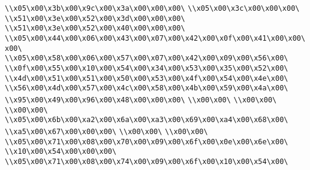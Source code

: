 \verb|\\x05\x00\x3b\x00\x9c\x00\x3a\x00\x00\x00\|\newline
\verb|\\x05\x00\x3c\x00\x00\x00\|\newline
\verb|\\x51\x00\x3e\x00\x52\x00\x3d\x00\x00\x00\|\newline
\verb|\\x51\x00\x3e\x00\x52\x00\x40\x00\x00\x00\|\newline
\verb|\\x05\x00\x44\x00\x06\x00\x43\x00\x07\x00\x42\x00\x0f\x00\x41\x00\x00\x00\|\newline
\verb|\\x05\x00\x58\x00\x06\x00\x57\x00\x07\x00\x42\x00\x09\x00\x56\x00\|\newline
\verb|\\x0f\x00\x55\x00\x10\x00\x54\x00\x34\x00\x53\x00\x35\x00\x52\x00\|\newline
\verb|\\x4d\x00\x51\x00\x51\x00\x50\x00\x53\x00\x4f\x00\x54\x00\x4e\x00\|\newline
\verb|\\x56\x00\x4d\x00\x57\x00\x4c\x00\x58\x00\x4b\x00\x59\x00\x4a\x00\|\newline
\verb|\\x95\x00\x49\x00\x96\x00\x48\x00\x00\x00\|\newline
\verb|\\x00\x00\|\newline
\verb|\\x00\x00\|\newline
\verb|\\x00\x00\|\newline
\verb|\\x05\x00\x6b\x00\xa2\x00\x6a\x00\xa3\x00\x69\x00\xa4\x00\x68\x00\|\newline
\verb|\\xa5\x00\x67\x00\x00\x00\|\newline
\verb|\\x00\x00\|\newline
\verb|\\x00\x00\|\newline
\verb|\\x05\x00\x71\x00\x08\x00\x70\x00\x09\x00\x6f\x00\x0e\x00\x6e\x00\|\newline
\verb|\\x10\x00\x54\x00\x00\x00\|\newline
\verb|\\x05\x00\x71\x00\x08\x00\x74\x00\x09\x00\x6f\x00\x10\x00\x54\x00\|\newline

